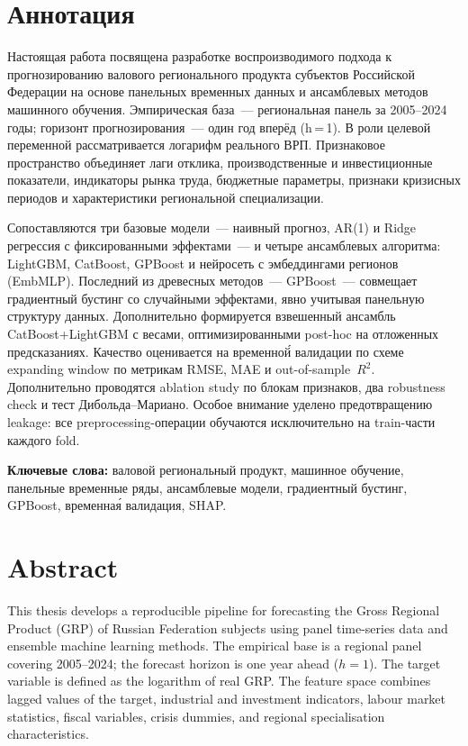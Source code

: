 \documentclass[12pt,a4paper]{article}
\begin{document}
\newpage
\section*{Аннотация}

Настоящая работа посвящена разработке воспроизводимого подхода
к прогнозированию валового регионального продукта субъектов Российской
Федерации на основе панельных временных данных и ансамблевых методов
машинного обучения. Эмпирическая база~--- региональная панель за 2005--2024
годы; горизонт прогнозирования~--- один год вперёд (h\,=\,1). В роли целевой
переменной рассматривается логарифм реального ВРП. Признаковое пространство
объединяет лаги отклика, производственные и инвестиционные показатели,
индикаторы рынка труда, бюджетные параметры, признаки кризисных периодов
и характеристики региональной специализации.

Сопоставляются три базовые модели~--- наивный прогноз, AR(1) и Ridge
регрессия с фиксированными эффектами~--- и четыре ансамблевых алгоритма:
LightGBM, CatBoost, GPBoost и нейросеть с эмбеддингами регионов (EmbMLP).
Последний из древесных методов~--- GPBoost~--- совмещает градиентный бустинг
со случайными эффектами, явно учитывая панельную структуру данных.
Дополнительно формируется взвешенный ансамбль CatBoost+LightGBM с весами,
оптимизированными post-hoc на отложенных предсказаниях. Качество оценивается
на временно\'{й} валидации по схеме expanding window по метрикам RMSE, MAE
и out-of-sample~$R^2$. Дополнительно проводятся ablation study по блокам
признаков, два robustness check и тест Дибольда--Мариано. Особое внимание
уделено предотвращению leakage: все preprocessing-операции обучаются
исключительно на train-части каждого fold.

\smallskip\noindent
\textbf{Ключевые слова:} валовой региональный продукт, машинное обучение,
панельные временные ряды, ансамблевые модели, градиентный бустинг,
GPBoost, временна\'{я} валидация, SHAP.

\newpage
\section*{Abstract}

This thesis develops a reproducible pipeline for forecasting the Gross Regional
Product (GRP) of Russian Federation subjects using panel time-series data and
ensemble machine learning methods. The empirical base is a regional panel
covering 2005--2024; the forecast horizon is one year ahead ($h=1$). The target
variable is defined as the logarithm of real GRP. The feature space combines
lagged values of the target, industrial and investment indicators, labour market
statistics, fiscal variables, crisis dummies, and regional specialisation
characteristics.
\end{document}
